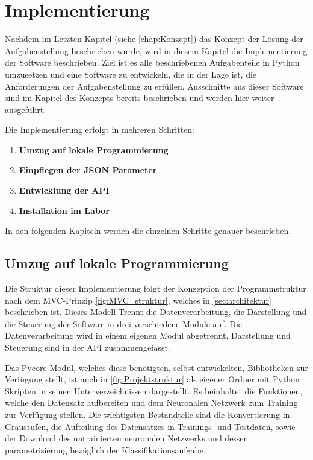 \chapter{Implementierung} \label{chap:implementierung}

Nachdem im Letzten Kapitel (siehe \autoref{chap:Konzept}) das Konzept der Lösung der Aufgabenstellung beschrieben wurde, wird in diesem Kapitel die Implementierung der Software beschrieben.
Ziel ist es alle beschriebenen Aufgabenteile in Python umzusetzen und eine Software zu entwickeln, die in der Lage ist, die Anforderungen der Aufgabenstellung zu erfüllen. Ausschnitte aus dieser Software sind im Kapitel des Konzepts bereits beschrieben und werden hier weiter ausgeführt.

Die Implementierung erfolgt in mehreren Schritten:

\begin{enumerate}
    \item \textbf{Umzug auf lokale Programmierung} 
    \item \textbf{Einpflegen der JSON Parameter} 
    \item \textbf{Entwicklung der API} 
    \item \textbf{Installation im Labor}

\end{enumerate}

In den folgenden Kapiteln werden die einzelnen Schritte genauer beschrieben.

\section{Umzug auf lokale Programmierung} \label{subsec:umzug_auf_lokale_programmierung}

Die Struktur dieser Implementierung folgt der Konzeption der Programmstruktur nach dem MVC-Prinzip \autoref{fig:MVC_struktur}, welches in \autoref{sec:architektur} beschrieben ist.
Dieses Modell Trennt die Datenverarbeitung, die Darstellung und die Steuerung der Software in drei verschiedene Module auf.
Die Datenverarbeitung wird in einem eigenen Modul abgetrennt, Darstellung und Steuerung sind in der API zusammengefasst.

Das Pycore Modul, welches diese benötigten, selbst entwickelten, Bibliotheken zur Verfügung stellt, ist auch in \autoref{fig:Projektstruktur} als eigener Ordner mit Python Skripten in seinen Unterverzeichnissen dargestellt. Es beinhaltet die Funktionen, welche den Datensatz aufbereiten und dem Neuronalen Netzwerk zum Training zur Verfügung stellen.
Die wichtigsten Bestandteile sind die Konvertierung in Graustufen, die Aufteilung des Datensatzes in Trainings- und Testdaten, sowie der Download des untrainierten neuronalen Netzwerks und dessen parametrisierung bezüglich der Klassifikationsaufgabe.

